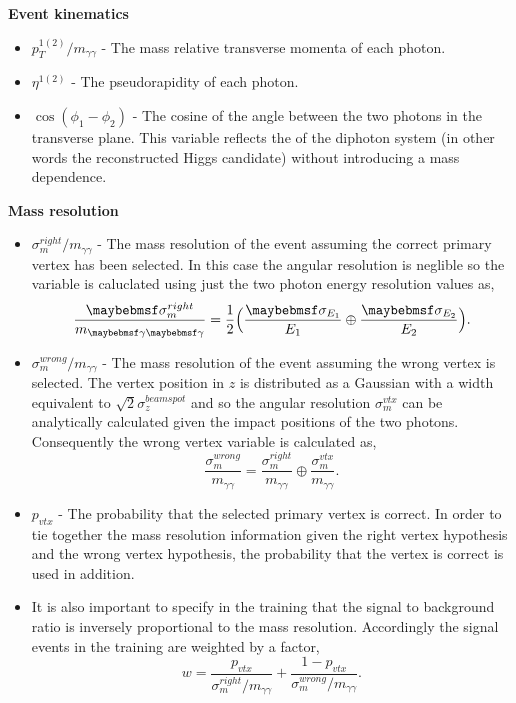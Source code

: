 \noindent\textbf{Event kinematics}
\begin{itemize}
  \item $p_{T}^{1(2)}/m_{\gamma\gamma}$ - The mass relative transverse momenta of each photon.
  \item $\eta^{1(2)}$ - The pseudorapidity of each photon.
  \item $\cos(\phi_{1}-\phi_{2})$ - The cosine of the angle between the two photons in the transverse plane. This variable reflects the \pT of the diphoton system (in other words the reconstructed Higgs candidate) without introducing a mass dependence.
\end{itemize}

\noindent\textbf{Mass resolution}
\begin{itemize}
  \item $\sigma_{m}^{right}/m_{\gamma\gamma}$ - The mass resolution of the event assuming the correct primary vertex has been selected. In this case the angular resolution is neglible so the variable is caluclated using just the two photon energy resolution values as,
    \begin{equation}
      \frac{\sigma_{m}^{right}}{m_{\gamma\gamma}} = \frac{1}{2}\Bigl(\frac{\sigma_{E_{1}}}{E_{1}} \oplus \frac{\sigma_{E_{2}}}{E_{2}}\Bigr).
    \end{equation}
  \item $\sigma_{m}^{wrong}/m_{\gamma\gamma}$ - The mass resolution of the event assuming the wrong vertex is selected. The vertex position in $z$ is distributed as a Gaussian with a width equivalent to $\sqrt{2}\sigma_{z}^{beamspot}$ and so the angular resolution $\sigma_{m}^{vtx}$ can be analytically calculated given the \ECAL impact positions of the two photons. Consequently the wrong vertex variable is calculated as,
    \begin{equation}
      \frac{\sigma_{m}^{wrong}}{m_{\gamma\gamma}} = \frac{\sigma_{m}^{right}}{m_{\gamma\gamma}} \oplus \frac{\sigma_{m}^{vtx}}{m_{\gamma\gamma}}.
    \end{equation}
  \item $p_{vtx}$ - The probability that the selected primary vertex is correct. In order to tie together the mass resolution information given the right vertex hypothesis and the wrong vertex hypothesis, the probability that the vertex is correct is used in addition.
  \item It is also important to specify in the training that the signal to background ratio is inversely proportional to the mass resolution. Accordingly the signal events in the training are weighted by a factor,
    \begin{equation}
      w = \frac{p_{vtx}}{\sigma_{m}^{right}/m_{\gamma\gamma}} + \frac{1-p_{vtx}}{\sigma_{m}^{wrong}/m_{\gamma\gamma}}.
    \end{equation}
\end{itemize}

